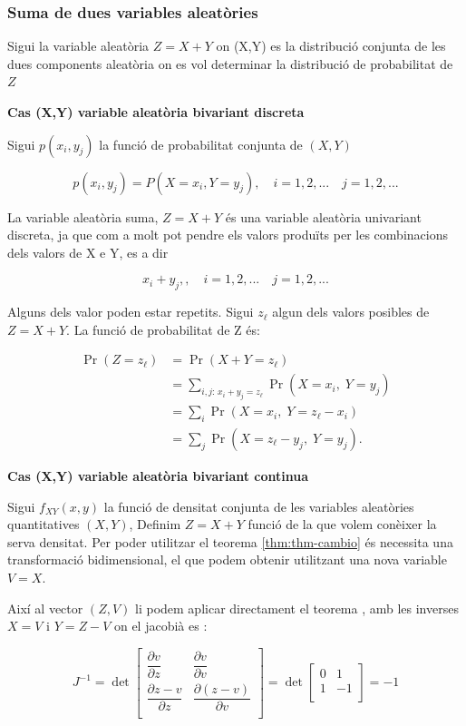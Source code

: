 \documentclass[
  catalan,
]{article}
\theoremstyle{definition}
\theoremstyle{definition}
\theoremstyle{definition}
\theoremstyle{definition}
\theoremstyle{remark}
\begin{document}
\subsubsection{Suma de dues variables aleatòries}\label{suma-de-dues-variables-aleatuxf2ries}

Sigui la variable aleatòria \(Z=X+Y\) on (X,Y) es la distribució conjunta de les dues components aleatòria on es vol determinar la distribució de probabilitat de \(Z\)

\textbf{Cas (X,Y) variable aleatòria bivariant discreta}

Sigui \(p(x_i,y_j)\) la funció de probabilitat conjunta de \((X, Y)\)

\[
p(x_i,y_j)=P(X=x_i, Y=y_j), \quad  i=1,2,...\quad  j=1,2,...
\]

La variable aleatòria suma, \(Z=X+Y\) és una variable aleatòria univariant discreta, ja que com a molt pot pendre els valors produïts per les combinacions dels valors de X e Y, es a dir

\[
x_i+y_j, , \quad  i=1,2,...\quad  j=1,2,...
\]

Alguns dels valor poden estar repetits. Sigui \(z_\ell\) algun dels valors posibles de \(Z=X+Y\). La funció de probabilitat de Z és:

\[
\begin{aligned}
\Pr(Z = z_\ell)
&=\Pr(X+Y = z_\ell) \\
&=\sum_{i,j:\,x_i+y_j=z_\ell}
   \Pr(X=x_i,\;Y=y_j) \\
&=\sum_i
   \Pr(X=x_i,\;Y=z_\ell-x_i) \\
&=\sum_j
   \Pr(X=z_\ell-y_j,\;Y=y_j).
\end{aligned}
\]

\textbf{Cas (X,Y) variable aleatòria bivariant continua}

Sigui \(f_{XY}(x,y)\) la funció de densitat conjunta de les variables aleatòries quantitatives \((X,Y)\), Definim \(Z=X+Y\) funció de la que volem conèixer la serva densitat. Per poder utilitzar el teorema \ref{thm:thm-cambio}
és necessita una transformació bidimensional, el que podem obtenir utilitzant una nova variable \(V=X\).

Així al vector \((Z,V)\) li podem aplicar directament el teorema , amb les inverses \(X=V\) i \(Y=Z-V\) on el jacobià es :

\[
J^{-1}=\det 
\begin{bmatrix}
\dfrac {\partial v } {\partial z}  & \dfrac {\partial v } {\partial v}  \\
\dfrac {\partial z- v } {\partial z}  & \dfrac {\partial (z-v) } {\partial v}  \\
\end{bmatrix}=
\det \begin{bmatrix}
 0  &  1  \\
1  &  -1 \\
\end{bmatrix}
=-1
\]
\end{document}
